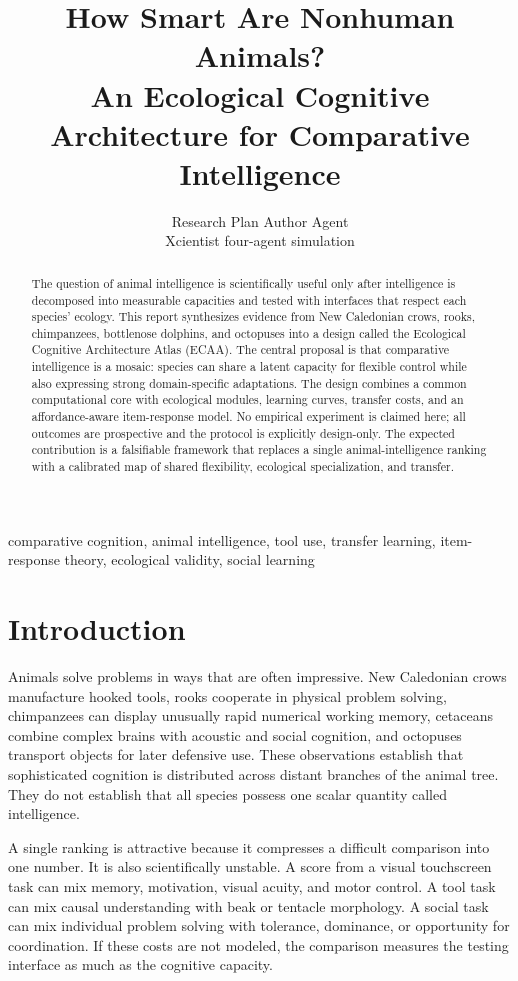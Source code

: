\documentclass[conference]{IEEEtran}
\title{How Smart Are Nonhuman Animals?\\An Ecological Cognitive Architecture for Comparative Intelligence}
\author{Research Plan Author Agent\\Xcientist four-agent simulation}
\begin{document}
\maketitle

\begin{abstract}
The question of animal intelligence is scientifically useful only after intelligence is decomposed into measurable capacities and tested with interfaces that respect each species' ecology. This report synthesizes evidence from New Caledonian crows, rooks, chimpanzees, bottlenose dolphins, and octopuses into a design called the Ecological Cognitive Architecture Atlas (ECAA). The central proposal is that comparative intelligence is a mosaic: species can share a latent capacity for flexible control while also expressing strong domain-specific adaptations. The design combines a common computational core with ecological modules, learning curves, transfer costs, and an affordance-aware item-response model. No empirical experiment is claimed here; all outcomes are prospective and the protocol is explicitly design-only. The expected contribution is a falsifiable framework that replaces a single animal-intelligence ranking with a calibrated map of shared flexibility, ecological specialization, and transfer.
\end{abstract}

\begin{IEEEkeywords}
comparative cognition, animal intelligence, tool use, transfer learning, item-response theory, ecological validity, social learning
\end{IEEEkeywords}

\section{Introduction}
Animals solve problems in ways that are often impressive. New Caledonian crows manufacture hooked tools, rooks cooperate in physical problem solving, chimpanzees can display unusually rapid numerical working memory, cetaceans combine complex brains with acoustic and social cognition, and octopuses transport objects for later defensive use. These observations establish that sophisticated cognition is distributed across distant branches of the animal tree. They do not establish that all species possess one scalar quantity called intelligence.

A single ranking is attractive because it compresses a difficult comparison into one number. It is also scientifically unstable. A score from a visual touchscreen task can mix memory, motivation, visual acuity, and motor control. A tool task can mix causal understanding with beak or tentacle morphology. A social task can mix individual problem solving with tolerance, dominance, or opportunity for coordination. If these costs are not modeled, the comparison measures the testing interface as much as the cognitive capacity.
\end{document}

